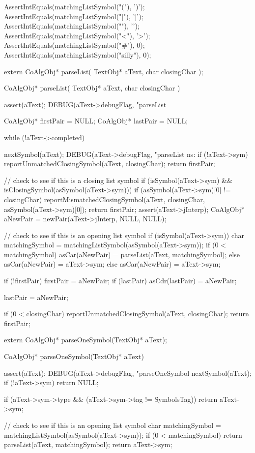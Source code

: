 \startCTest
  AssertIntEquals(matchingListSymbol("("), ')');
  AssertIntEquals(matchingListSymbol("["), ']');
  AssertIntEquals(matchingListSymbol("{"), '}');
  AssertIntEquals(matchingListSymbol("<"), '>');
  AssertIntEquals(matchingListSymbol("#"), 0);
  AssertIntEquals(matchingListSymbol("silly"), 0);
\stopCTest
\stopTestCase
\stopTestSuite

\startCHeader
extern CoAlgObj* parseList(
  TextObj* aText,
  char closingChar
);
\stopCHeader

\startCCode
CoAlgObj* parseList(
  TextObj* aText,
  char closingChar
) {
  assert(aText);
  DEBUG(aText->debugFlag,
    "parseList %

  CoAlgObj* firstPair = NULL;
  CoAlgObj* lastPair  = NULL;

  while (!aText->completed) {

    nextSymbol(aText);
    DEBUG(aText->debugFlag,
      "parseList ns: %
    if (!aText->sym) {
      reportUnmatchedClosingSymbol(aText, closingChar);
      return firstPair;
    }

    // check to see if this is a closing list symbol
    if (isSymbol(aText->sym) &&
        isClosingSymbol(asSymbol(aText->sym))) {
      if (asSymbol(aText->sym)[0] != closingChar) {
        reportMismatchedClosingSymbol(aText, closingChar,
                                      asSymbol(aText->sym)[0]);
      }
      return firstPair;
    }
    assert(aText->jInterp);
    CoAlgObj* aNewPair = newPair(aText->jInterp, NULL, NULL);

    // check to see if this is an opening list symbol
    if (isSymbol(aText->sym)) {
      char matchingSymbol = matchingListSymbol(asSymbol(aText->sym));
      if (0 < matchingSymbol) {
        asCar(aNewPair) = parseList(aText, matchingSymbol);
      } else asCar(aNewPair) = aText->sym;
    } else asCar(aNewPair) = aText->sym;

    if (!firstPair) firstPair       = aNewPair;
    if (lastPair)   asCdr(lastPair) = aNewPair;

    lastPair = aNewPair;
  }

  if (0 < closingChar) reportUnmatchedClosingSymbol(aText, closingChar);
  return firstPair;
}
\stopCCode


\startCHeader
extern CoAlgObj* parseOneSymbol(TextObj* aText);
\stopCHeader

\startCCode
CoAlgObj* parseOneSymbol(TextObj* aText) {
  assert(aText);
  DEBUG(aText->debugFlag, "parseOneSymbol %
  nextSymbol(aText);
  if (!aText->sym) return NULL;

  if (aText->sym->type &&
     (aText->sym->tag != SymbolsTag)) return aText->sym;

  // check to see if this is an opening list symbol
  char matchingSymbol = matchingListSymbol(asSymbol(aText->sym));
  if (0 < matchingSymbol) {
    return parseList(aText, matchingSymbol);
  }
  return aText->sym;
}
\stopCCode

